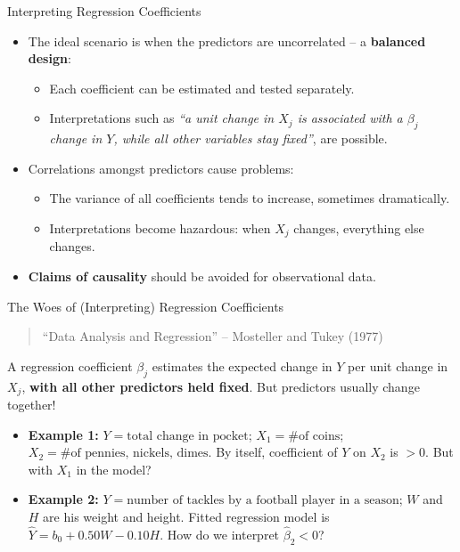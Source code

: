 \documentclass[aspectratio=169, 11pt]{beamer}
\begin{document}
\begin{frame}{Interpreting Regression Coefficients}
  \begin{itemize}
    \item The ideal scenario is when the predictors are uncorrelated -- a \textbf{balanced design}:
    \begin{itemize}
      \item Each coefficient can be estimated and tested separately.
      \item Interpretations such as \textit{``a unit change in $X_j$ is associated with a $\beta_j$ change in $Y$, while all other variables stay fixed''}, are possible.
    \end{itemize}
    \item Correlations amongst predictors cause problems:
    \begin{itemize}
      \item The variance of all coefficients tends to increase, sometimes dramatically.
      \item Interpretations become hazardous: when $X_j$ changes, everything else changes.
    \end{itemize}
    \item \textbf{Claims of causality} should be avoided for observational data.
  \end{itemize}
\end{frame}

\begin{frame}{The Woes of (Interpreting) Regression Coefficients}
  \begin{quote}
    ``Data Analysis and Regression'' -- Mosteller and Tukey (1977)
  \end{quote}
  A regression coefficient $\beta_j$ estimates the expected change in $Y$ per unit change in $X_j$, \textbf{with all other predictors held fixed}. But predictors usually change together! \pause
  
  \begin{itemize}
    \item \textbf{Example 1:} $Y = \text{total change in pocket}$; $X_1 = \text{\# of coins}$; $X_2 = \text{\# of pennies, nickels, dimes}$. By itself, coefficient of $Y$ on $X_2$ is $> 0$. But with $X_1$ in the model? \pause

    \item \textbf{Example 2:} $Y = \text{number of tackles by a football player in a season}$; $W$ and $H$ are his weight and height. Fitted regression model is $\hat{Y} = b_0 + 0.50 W - 0.10 H$. How do we interpret $\hat{\beta}_2 < 0$?
  \end{itemize}
\end{frame}
\end{document}
